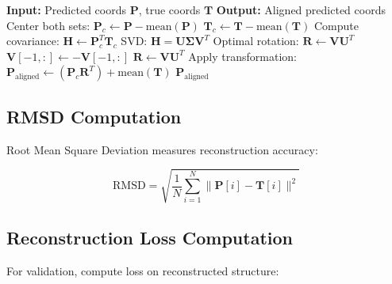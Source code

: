 \documentclass[11pt,a4paper]{article}
\begin{document}
\begin{algorithm}
\caption{Kabsch Alignment}
\begin{algorithmic}[1]
\State \textbf{Input:} Predicted coords $\mathbf{P}$, true coords $\mathbf{T}$
\State \textbf{Output:} Aligned predicted coords
\State
\State Center both sets:
\State $\mathbf{P}_c \gets \mathbf{P} - \text{mean}(\mathbf{P})$
\State $\mathbf{T}_c \gets \mathbf{T} - \text{mean}(\mathbf{T})$
\State
\State Compute covariance:
\State $\mathbf{H} \gets \mathbf{P}_c^T \mathbf{T}_c$
\State
\State SVD: $\mathbf{H} = \mathbf{U} \mathbf{\Sigma} \mathbf{V}^T$
\State
\State Optimal rotation:
\State $\mathbf{R} \gets \mathbf{V} \mathbf{U}^T$
    \State $\mathbf{V}[-1, :] \gets -\mathbf{V}[-1, :]$
    \State $\mathbf{R} \gets \mathbf{V} \mathbf{U}^T$
\EndIf
\State
\State Apply transformation:
\State $\mathbf{P}_{\text{aligned}} \gets (\mathbf{P}_c \mathbf{R}^T) + \text{mean}(\mathbf{T})$
\State
\State \Return $\mathbf{P}_{\text{aligned}}$
\end{algorithmic}
\end{algorithm}

\subsection{RMSD Computation}

Root Mean Square Deviation measures reconstruction accuracy:

\begin{equation}
\text{RMSD} = \sqrt{\frac{1}{N} \sum_{i=1}^{N} \|\mathbf{P}[i] - \mathbf{T}[i]\|^2}
\end{equation}

\subsection{Reconstruction Loss Computation}

For validation, compute loss on reconstructed structure:
\end{document}
